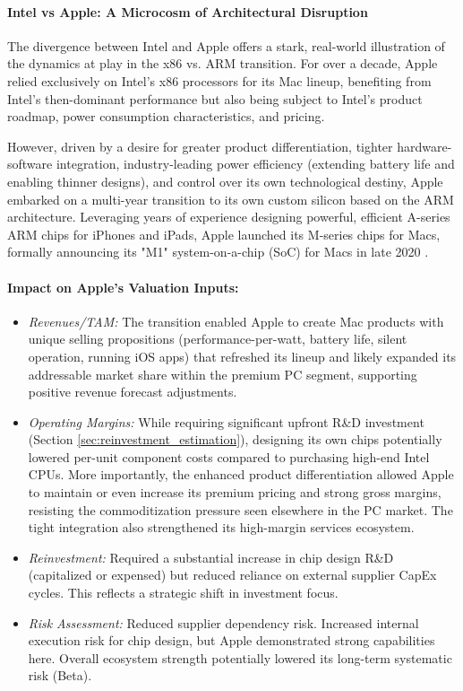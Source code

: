 \paragraph{Intel vs Apple: A Microcosm of Architectural Disruption}

The divergence between Intel and Apple offers a stark, real-world illustration of the dynamics at play in the x86 vs. ARM transition. For over a decade, Apple relied exclusively on Intel's x86 processors for its Mac lineup, benefiting from Intel's then-dominant performance but also being subject to Intel's product roadmap, power consumption characteristics, and pricing.

However, driven by a desire for greater product differentiation, tighter hardware-software integration, industry-leading power efficiency (extending battery life and enabling thinner designs), and control over its own technological destiny, Apple embarked on a multi-year transition to its own custom silicon based on the ARM architecture. Leveraging years of experience designing powerful, efficient A-series ARM chips for iPhones and iPads, Apple launched its M-series chips for Macs, formally announcing its "M1" system-on-a-chip (SoC) for Macs in late 2020 \parencite{apple2020m1}.

\paragraph{Impact on Apple's Valuation Inputs:}
\begin{itemize}
    \item \textit{Revenues/TAM:} The transition enabled Apple to create Mac products with unique selling propositions (performance-per-watt, battery life, silent operation, running iOS apps) that refreshed its lineup and likely expanded its addressable market share within the premium PC segment, supporting positive revenue forecast adjustments.
    \item \textit{Operating Margins:} While requiring significant upfront R\&D investment (Section \ref{sec:reinvestment_estimation}), designing its own chips potentially lowered per-unit component costs compared to purchasing high-end Intel CPUs. More importantly, the enhanced product differentiation allowed Apple to maintain or even increase its premium pricing and strong gross margins, resisting the commoditization pressure seen elsewhere in the PC market. The tight integration also strengthened its high-margin services ecosystem.
    \item \textit{Reinvestment:} Required a substantial increase in chip design R\&D (capitalized or expensed) but reduced reliance on external supplier CapEx cycles. This reflects a strategic shift in investment focus.
    \item \textit{Risk Assessment:} Reduced supplier dependency risk. Increased internal execution risk for chip design, but Apple demonstrated strong capabilities here. Overall ecosystem strength potentially lowered its long-term systematic risk (Beta).
\end{itemize}


